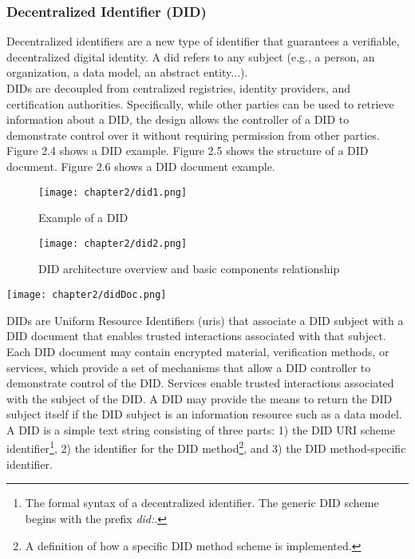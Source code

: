 \subsubsection{Decentralized Identifier (DID)}
Decentralized identifiers\cite{site:w3cdids} are a new type of identifier that guarantees a verifiable, 
decentralized digital identity. A \acrshort{did} refers to any subject (e.g., a person, an 
organization, a data model, an abstract entity...).\\
DIDs are decoupled from centralized registries, identity providers, and certification 
authorities. Specifically, while other parties can be used to retrieve information 
about a DID, the design allows the controller of a DID to demonstrate control over it 
without requiring permission from other parties.
Figure 2.4 shows a DID example. Figure 2.5 shows the structure of a DID document.
Figure 2.6 shows a DID document example.
\begin{figure}[!htb]
    \begin{minipage}{0.48\textwidth}
      \centering
      \texttt{[image: chapter2/did1.png]}
      \vspace{1.1cm}
      \caption{Example of a DID}
    \end{minipage}\hfill
    \begin{minipage}{0.48\textwidth}
      \centering
      \texttt{[image: chapter2/did2.png]}
      \caption{DID architecture overview and basic components relationship}
    \end{minipage}
 \end{figure}
\begin{center}
    \vspace{-0.6cm}
    \texttt{[image: chapter2/didDoc.png]}
    \vspace{-0.4cm}
\end{center}
\vspace{0.5cm}
DIDs are Uniform Resource Identifiers (\acrshort{uri}s) that associate a DID subject with a DID 
document that enables trusted interactions associated with that subject.
Each DID document may contain encrypted material, verification methods, or services, 
which provide a set of mechanisms that allow a DID controller to demonstrate control 
of the DID. Services enable trusted interactions associated with the subject of the 
DID. A DID may provide the means to return the DID subject itself if the DID subject 
is an information resource such as a data model.\\
A DID is a simple text string consisting of three parts: 1) the DID URI scheme 
identifier\footnote{The formal syntax of a decentralized identifier. The generic 
DID scheme begins with the prefix \textit{did:}.}, 2) the identifier for the DID 
method\footnote{A definition of how a specific DID method scheme is implemented.}, and 3) 
the DID method-specific identifier.

